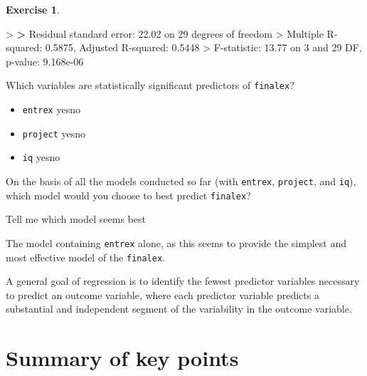 \documentclass[
]{book}
\newenvironment{Shaded}{\begin{snugshade}}{\end{snugshade}}
\newcommand{\DecValTok}[1]{\textcolor[rgb]{0.00,0.00,0.81}{#1}}
\newcommand{\ErrorTok}[1]{\textcolor[rgb]{0.64,0.00,0.00}{\textbf{#1}}}
\newcommand{\FloatTok}[1]{\textcolor[rgb]{0.00,0.00,0.81}{#1}}
\newcommand{\NormalTok}[1]{#1}
\newcommand{\SpecialCharTok}[1]{\textcolor[rgb]{0.00,0.00,0.00}{#1}}
\theoremstyle{definition}
\theoremstyle{definition}
\theoremstyle{definition}
\newtheorem{exercise}{Exercise}[chapter]
\theoremstyle{definition}
\theoremstyle{remark}
\begin{document}
\begin{exercise}
\begin{Shaded}
\begin{Highlighting}[]
\SpecialCharTok{\textgreater{}} 
\ErrorTok{\textgreater{}}\NormalTok{ Residual standard error}\SpecialCharTok{:} \FloatTok{22.02}\NormalTok{ on }\DecValTok{29}\NormalTok{ degrees of freedom}
\SpecialCharTok{\textgreater{}}\NormalTok{ Multiple R}\SpecialCharTok{{-}}\NormalTok{squared}\SpecialCharTok{:}  \FloatTok{0.5875}\NormalTok{,  Adjusted R}\SpecialCharTok{{-}}\NormalTok{squared}\SpecialCharTok{:}  \FloatTok{0.5448} 
\SpecialCharTok{\textgreater{}}\NormalTok{ F}\SpecialCharTok{{-}}\NormalTok{statistic}\SpecialCharTok{:} \FloatTok{13.77}\NormalTok{ on }\DecValTok{3}\NormalTok{ and }\DecValTok{29}\NormalTok{ DF,  p}\SpecialCharTok{{-}}\NormalTok{value}\SpecialCharTok{:} \FloatTok{9.168e{-}06}
\end{Highlighting}
\end{Shaded}

Which variables are statistically significant predictors of \texttt{finalex}?

\begin{itemize}
\item
  \texttt{entrex} yesno
\item
  \texttt{project} yesno
\item
  \texttt{iq} yesno
\end{itemize}

On the basis of all the models conducted so far (with \texttt{entrex}, \texttt{project}, and \texttt{iq}), which model would you choose to best predict \texttt{finalex}?

Tell me which model seems best

The model containing \texttt{entrex} alone, as this seems to provide the simplest and most effective model of the \texttt{finalex}.

A general goal of regression is to identify the fewest predictor variables necessary to predict an outcome variable, where each predictor variable predicts a substantial and independent segment of the variability in the outcome variable.

\end{exercise}

\hypertarget{summary-of-key-points}{%
\section{Summary of key points}\label{summary-of-key-points}}
\end{document}
